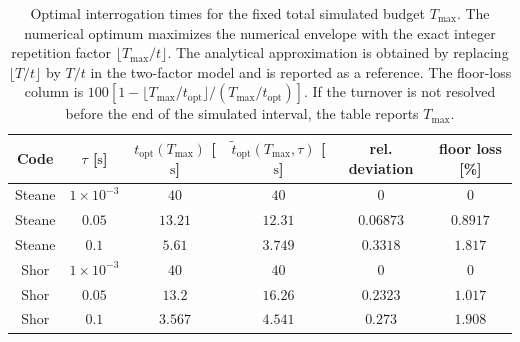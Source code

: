 \begin{table}[h]
    \centering
    \caption{Optimal interrogation times for the fixed total simulated budget
    $T_{\max}$. The numerical optimum maximizes the numerical envelope with
    the exact integer repetition factor $\lfloor T_{\max}/t\rfloor$. The
    analytical approximation is obtained by replacing $\lfloor T/t\rfloor$
    by $T/t$ in the two-factor model and is reported as a reference. The
    floor-loss column is
    $100[1-\lfloor T_{\max}/t_{\mathrm{opt}}\rfloor/
    (T_{\max}/t_{\mathrm{opt}})]$. If the turnover is not resolved before
    the end of the simulated interval, the table reports $T_{\max}$.}
    \label{tab:optimal-times}
    \begin{tabular}{|c|c|c|c|c|c|}
        \hline
        Code & $\tau$ [$\mathrm{s}$] & $t_{\mathrm{opt}}(T_{\max})$ [$\mathrm{s}$]
        & $\widetilde t_{\mathrm{opt}}(T_{\max},\tau)$ [$\mathrm{s}$]
        & rel. deviation & floor loss [\%] \\
        \hline
        Steane & $1\times10^{-3}$ & $40$ & $40$ & $0$ & $0$ \\
        Steane & $0.05$ & $13.21$ & $12.31$ & $0.06873$ & $0.8917$ \\
        Steane & $0.1$ & $5.61$ & $3.749$ & $0.3318$ & $1.817$ \\
        Shor & $1\times10^{-3}$ & $40$ & $40$ & $0$ & $0$ \\
        Shor & $0.05$ & $13.2$ & $16.26$ & $0.2323$ & $1.017$ \\
        Shor & $0.1$ & $3.567$ & $4.541$ & $0.273$ & $1.908$ \\
        \hline
    \end{tabular}
\end{table}
